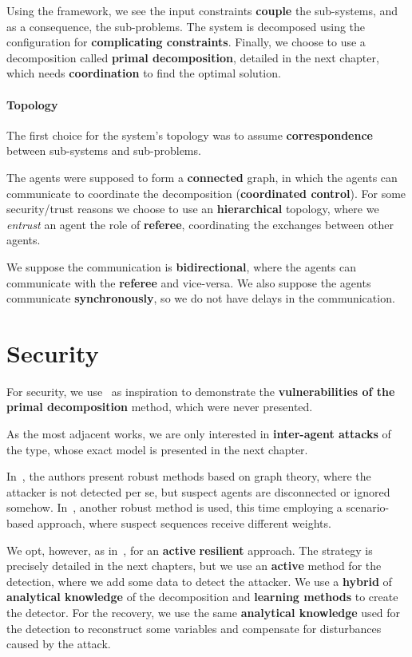 \documentclass[../main.tex]{subfiles}
\begin{document}
Using the framework, we see the input constraints \textbf{couple} the sub-systems, and as a consequence, the sub-problems.
The system is decomposed using the configuration for \textbf{complicating constraints}. Finally, we choose to use a decomposition called \textbf{primal decomposition}, detailed in the next chapter, which needs \textbf{coordination} to find the optimal solution.

\paragraph*{Topology}\label{sec:decomposition_chosen}
The first choice for the system's topology was to assume \textbf{correspondence} between sub-systems and sub-problems.

The agents were supposed to form a \textbf{connected} graph, in which the agents can communicate to coordinate the decomposition (\textbf{coordinated control}).
For some security/trust reasons we choose to use an \textbf{hierarchical} topology, where we \emph{entrust} an agent the role of \textbf{referee}, coordinating the exchanges between other agents.

We suppose the communication is \textbf{bidirectional}, where the agents can communicate with the \textbf{referee} and vice-versa.
We also suppose the agents communicate \textbf{synchronously}, so we do not have delays in the communication.

\section*{Security}
For security, we use~\cite{VelardeEtAl2017b,ChanfreutEtAl2018} as inspiration to demonstrate the \textbf{vulnerabilities of the primal decomposition} method, which were never presented.

As the most adjacent works, we are only interested in \textbf{inter-agent attacks} of the \textbf{\fdi{}} type, whose exact model is presented in the next chapter.

In~\cite{VelardeEtAl2017b,VelardeEtAl2018}, the authors present robust methods based on graph theory, where the attacker is not detected per se, but suspect agents are disconnected or ignored somehow.
In~\cite{VelardeEtAl2017a,MaestreEtAl2021}, another robust method is used, this time employing a scenario-based approach, where suspect sequences receive different weights.

We opt, however, as in~\cite{AnandutaEtAl2018,AnandutaEtAl2019,AnandutaEtAl2020},
for an \textbf{active} \textbf{resilient} approach.
The strategy is precisely detailed in the next chapters, but we use an \textbf{active} method for the detection, where we add some data to detect the attacker.
We use a \textbf{hybrid} of \textbf{analytical knowledge} of the decomposition and \textbf{learning methods} to create the detector.
For the recovery, we use the same \textbf{analytical knowledge} used for the detection to reconstruct some variables and compensate for disturbances caused by the attack.
\end{document}
